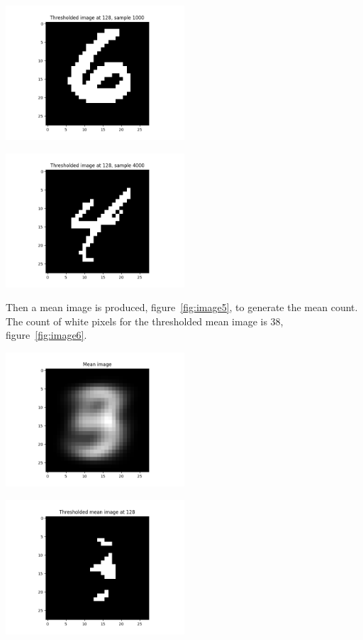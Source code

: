 \begin{center}
\includegraphics[width=0.5\textwidth]{image3.png}
\end{center}

\begin{center}
\includegraphics[width=0.5\textwidth]{image4.png}
\end{center}

Then a mean image is produced, figure~\ref{fig:image5}, to generate the mean count.
The count of white pixels for the thresholded mean image is 38, figure~\ref{fig:image6}.

\begin{center}
\includegraphics[width=0.5\textwidth]{image5.png}
\end{center}

\begin{center}
\includegraphics[width=0.5\textwidth]{image6.png}
\end{center}

